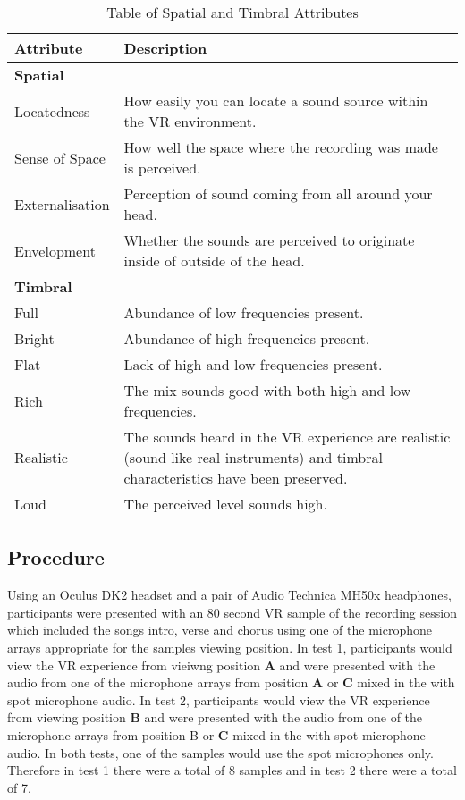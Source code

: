 		\begin{table}[h]
			\begin{tabular}{m{2.2cm} | m{}}
				\textbf{Attribute} & \textbf{Description} \\ \hline
				\multicolumn{2}{l}{\textbf{Spatial}} \\ \hline
				Locatedness & How easily you can locate a sound source within the VR environment. \\
				Sense of Space & How well the space where the recording was made is perceived. \\
				Externalisation & Perception of sound coming from all around your head. \\
				Envelopment & Whether the sounds are perceived to originate inside of outside of the head. \\ \hline
				\multicolumn{2}{l}{\textbf{Timbral}} \\ \hline
				Full & Abundance of low frequencies present. \\
				Bright & Abundance of high frequencies present. \\
				Flat & Lack of high and low frequencies present. \\
				Rich & The mix sounds good with both high and low frequencies. \\
				Realistic & The sounds heard in the VR experience are realistic (sound like real instruments) and timbral characteristics have been preserved. \\
				Loud & The perceived level sounds high.
			\end{tabular}
			\caption{Table of Spatial and Timbral Attributes}
			\label{table:attTable}
		\end{table} 
			

	\subsection{Procedure}

		Using an Oculus DK2 headset and a pair of Audio Technica MH50x headphones, participants were presented with an 80 second VR sample of the recording session which included the songs intro, verse and chorus using one of the microphone arrays appropriate for the samples viewing position. In test 1, participants would view the VR experience from vieiwng position \textbf{A} and were presented with the audio from one of the microphone arrays from position \textbf{A} or \textbf{C} mixed in the with spot microphone audio. In test 2, participants would view the VR experience from viewing position \textbf{B} and were presented with the audio from one of the microphone arrays from position \textbf{}B or \textbf{C} mixed in the with spot microphone audio. In both tests, one of the samples would use the spot microphones only. Therefore in test 1 there were a total of 8 samples and in test 2 there were a total of 7.

